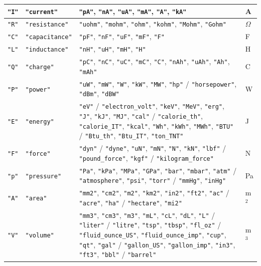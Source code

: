 \begin{table}[h]
\begin{tabular}{|l|l|p{10cm}|l|}
\hline
\texttt{"I"} & \texttt{"current"} & \texttt{"pA"}, \texttt{"nA"}, \texttt{"uA"}, \texttt{"mA"}, \texttt{"A"}, \texttt{"kA"} & A \\
\hline
\texttt{"R"} & \texttt{"resistance"} & \texttt{"uohm"}, \texttt{"mohm"}, \texttt{"ohm"}, \texttt{"kohm"}, \texttt{"Mohm"}, \texttt{"Gohm"} & $\Omega$ \\
\hline
\texttt{"C"} & \texttt{"capacitance"} & \texttt{"pF"}, \texttt{"nF"}, \texttt{"uF"}, \texttt{"mF"}, \texttt{"F"} & F \\
\hline
\texttt{"L"} & \texttt{"inductance"} & \texttt{"nH"}, \texttt{"uH"}, \texttt{"mH"}, \texttt{"H"} & H \\
\hline
\texttt{"Q"} & \texttt{"charge"} & \texttt{"pC"}, \texttt{"nC"}, \texttt{"uC"}, \texttt{"mC"}, \texttt{"C"}, \texttt{"nAh"}, \texttt{"uAh"}, \texttt{"Ah"}, \texttt{"mAh"} & C \\
\hline
\texttt{"P"} & \texttt{"power"} & \texttt{"uW"}, \texttt{"mW"}, \texttt{"W"}, \texttt{"kW"}, \texttt{"MW"}, \texttt{"hp"} / \texttt{"horsepower"}, \texttt{"dBm"}, \texttt{"dBW"} & W \\
\hline
\texttt{"E"} & \texttt{"energy"} & \texttt{"eV"} / \texttt{"electron\_volt"}, \texttt{"keV"}, \texttt{"MeV"}, \texttt{"erg"}, \texttt{"J"}, \texttt{"kJ"}, \texttt{"MJ"}, \texttt{"cal"} / \texttt{"calorie\_th"}, \texttt{"calorie\_IT"}, \texttt{"kcal"}, \texttt{"Wh"}, \texttt{"kWh"}, \texttt{"MWh"}, \texttt{"BTU"} / \texttt{"Btu\_th"}, \texttt{"Btu\_IT"}, \texttt{"ton\_TNT"} & J \\
\hline
\texttt{"F"} & \texttt{"force"} & \texttt{"dyn"} / \texttt{"dyne"}, \texttt{"uN"}, \texttt{"mN"}, \texttt{"N"}, \texttt{"kN"}, \texttt{"lbf"} / \texttt{"pound\_force"}, \texttt{"kgf"} / \texttt{"kilogram\_force"} & N \\
\hline
\texttt{"p"} & \texttt{"pressure"} & \texttt{"Pa"}, \texttt{"kPa"}, \texttt{"MPa"}, \texttt{"GPa"}, \texttt{"bar"}, \texttt{"mbar"}, \texttt{"atm"} / \texttt{"atmosphere"}, \texttt{"psi"}, \texttt{"torr"} / \texttt{"mmHg"}, \texttt{"inHg"} & Pa \\
\hline
\texttt{"A"} & \texttt{"area"} & \texttt{"mm2"}, \texttt{"cm2"}, \texttt{"m2"}, \texttt{"km2"}, \texttt{"in2"}, \texttt{"ft2"}, \texttt{"ac"} / \texttt{"acre"}, \texttt{"ha"} / \texttt{"hectare"}, \texttt{"mi2"} & m$^2$ \\
\hline
\texttt{"V"} & \texttt{"volume"} & \texttt{"mm3"}, \texttt{"cm3"}, \texttt{"m3"}, \texttt{"mL"}, \texttt{"cL"}, \texttt{"dL"}, \texttt{"L"} / \texttt{"liter"} / \texttt{"litre"}, \texttt{"tsp"}, \texttt{"tbsp"}, \texttt{"fl\_oz"} / \texttt{"fluid\_ounce\_US"}, \texttt{"fluid\_ounce\_imp"}, \texttt{"cup"}, \texttt{"qt"}, \texttt{"gal"} / \texttt{"gallon\_US"}, \texttt{"gallon\_imp"}, \texttt{"in3"}, \texttt{"ft3"}, \texttt{"bbl"} / \texttt{"barrel"} & m$^3$ \\

\end{tabular}
\end{table}
